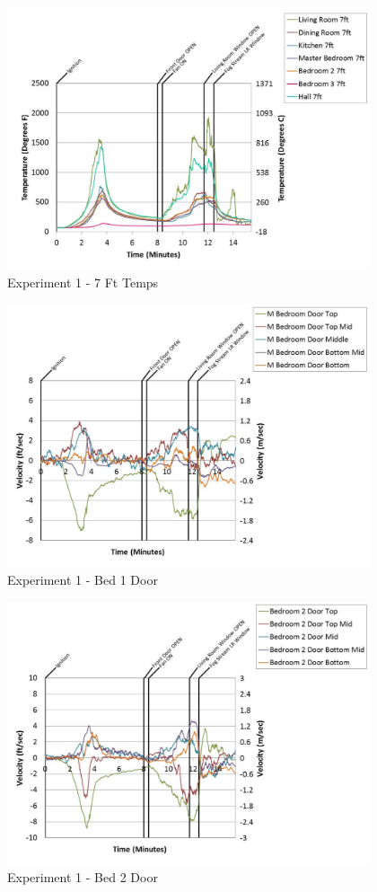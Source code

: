 \documentclass{article}
\begin{document}
\begin{appendices}
	\begin{figure}[h!]
		\centering
		\includegraphics[height=3.05in]{0_Images/Results_Charts/Exp_1_Charts/7FtTemps.pdf}
		\caption{Experiment 1 - 7 Ft Temps}
	\end{figure}
 
	\clearpage

	\begin{figure}[h!]
		\centering
		\includegraphics[height=3.05in]{0_Images/Results_Charts/Exp_1_Charts/Bed1Door.pdf}
		\caption{Experiment 1 - Bed 1 Door}
	\end{figure}
 

	\begin{figure}[h!]
		\centering
		\includegraphics[height=3.05in]{0_Images/Results_Charts/Exp_1_Charts/Bed2Door.pdf}
		\caption{Experiment 1 - Bed 2 Door}
	\end{figure}
 

\end{appendices}
\end{document}
